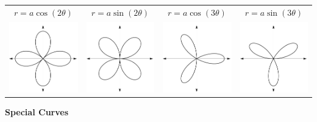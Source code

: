 \begin{tabular}{cccc}
$r=a\cos (2\theta)$ & $r=a\sin(2\theta)$ & $r=a\cos (3\theta)$ & $r=a\sin (3\theta)$ \\[10pt]
\includegraphics[width=.22\textwidth]{fig_parametric_11a} & \includegraphics[width=.22\textwidth]{fig_parametric_11b} & \includegraphics[width=.22\textwidth]{fig_parametric_11c} & \includegraphics[width=.22\textwidth]{fig_parametric_11d}
\end{tabular}

\textbf{\large Special Curves}\\


